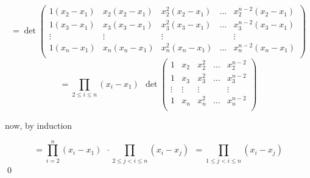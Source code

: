 \documentclass[a4paper]{article}
\theoremstyle{definition}
\begin{document}
$$
= \det
\begin{pmatrix}
    1(x_2-x_1) & x_2(x_2 - x_1) & x_2^2(x_2 - x_1) & \ldots & x_2^{n-2}(x_2 - x_1) \\
    1(x_3-x_1) & x_3(x_3 - x_1) & x_3^2(x_3 - x_1) & \ldots & x_3^{n-2}(x_3 - x_1) \\
    \vdots & \vdots & \vdots &  & \vdots\\
    1(x_n-x_1) & x_n(x_n - x_1) & x_n^2(x_n - x_1) & \ldots & x_n^{n-2}(x_n - x_1) \\
\end{pmatrix}
$$
$$
= \prod_{2 \leq i \leq n} (x_i - x_1) ~~\det
\begin{pmatrix}
    1 & x_2 & x_2^2 & \ldots & x_2^{n-2} \\
    1 & x_3 & x_3^2 & \ldots & x_3^{n-2} \\
    \vdots & \vdots & \vdots &  & \vdots\\
    1 & x_n & x_n^2 & \ldots & x_n^{n-2} \\
\end{pmatrix}
$$

now, by induction

$$
= \prod_{i=2}^n (x_i - x_1) ~~\cdot \prod_{2 \leq j < i \leq n} (x_i - x_j) ~~= \prod_{1 \leq j < i \leq n} (x_i - x_j)
$$
\qed






\end{document}
